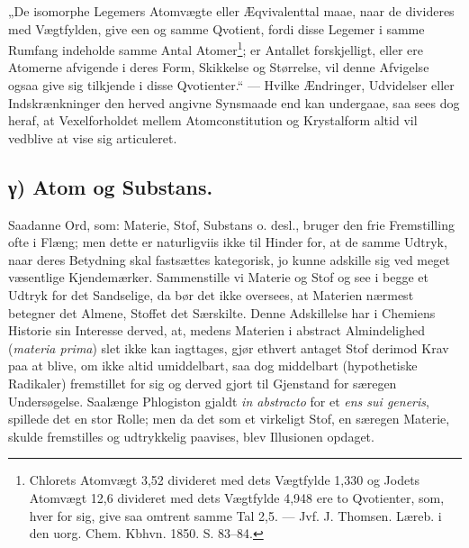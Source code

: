 \documentclass[12pt,a4paper]{book}
\begin{document}
\setcounter{footnote}{0}
„De isomorphe Legemers Atomvægte eller Æqvivalenttal
maae, naar de divideres med Vægtfylden, give een og samme
Qvotient, fordi disse Legemer i samme Rumfang indeholde
samme Antal Atomer\footnote{Chlorets Atomvægt 3,52 divideret med
dets Vægtfylde 1,330 og Jodets Atomvægt 12,6 divideret med dets
Vægtfylde 4,948 ere to Qvotienter, som, hver for sig, give saa
omtrent samme Tal 2,5. --- Jvf. J. Thomsen. Læreb. i den uorg.
Chem. Kbhvn. 1850. S. 83--84.}; er Antallet forskjelligt, eller ere
Atomerne afvigende i deres Form, Skikkelse og Størrelse,
vil denne Afvigelse ogsaa give sig tilkjende i disse Qvotienter.“
--- Hvilke Ændringer, Udvidelser eller Indskrænkninger den
herved angivne Synsmaade end kan undergaae, saa sees dog
heraf, at Vexelforholdet mellem Atomconstitution og Krystalform
altid vil vedblive at vise sig articuleret.

\subsection*{γ) Atom og Substans.}

Saadanne Ord, som: Materie, Stof, Substans o. desl.,
bruger den frie Fremstilling ofte i Flæng; men dette er
naturligviis ikke til Hinder for, at de samme Udtryk, naar deres
Betydning skal fastsættes kategorisk, jo kunne adskille sig ved
meget væsentlige Kjendemærker. Sammenstille vi Materie
og Stof og see i begge et Udtryk for det Sandselige, da
bør det ikke oversees, at Materien nærmest betegner det
Almene, Stoffet det Særskilte. Denne Adskillelse har i Chemiens
Historie sin Interesse derved, at, medens Materien i abstract
Almindelighed (\textit{materia prima}) slet ikke kan iagttages, gjør
ethvert antaget Stof derimod Krav paa at blive, om ikke
altid umiddelbart, saa dog middelbart (hypothetiske Radikaler)
fremstillet for sig og derved gjort til Gjenstand for særegen
Undersøgelse. Saalænge Phlogiston gjaldt \textit{in abstracto} for
et \textit{ens sui generis}, spillede det en stor Rolle; men da det
som et virkeligt Stof, en særegen Materie, skulde fremstilles
og udtrykkelig paavises, blev Illusionen opdaget.
\end{document}
